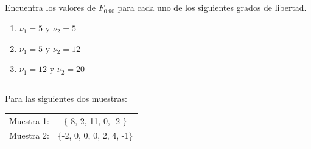 \documentclass[11pt,letterpaper]{report}
\begin{document}
      \subsection{}%
         Encuentra los valores de $F_{0.90}$ para cada uno de los siguientes grados de libertad.
        \begin{enumerate}
            \item $\nu_1=5$ y $\nu_2=5$
            \item $\nu_1=5$ y $\nu_2=12$
            \item $\nu_1=12$ y $\nu_2=20$
        \end{enumerate}


      \subsection{}%
        Para las siguientes dos muestras:
        \begin{table}[!h]
          \begin{tabular}{cc}
              Muestra 1:&$\{$ 8, 2, 11, 0, -2 $\}$\\
              Muestra 2:&$\{$-2, 0, 0, 0, 2, 4, -1$\}$
          \end{tabular}
        \end{table}
\end{document}
